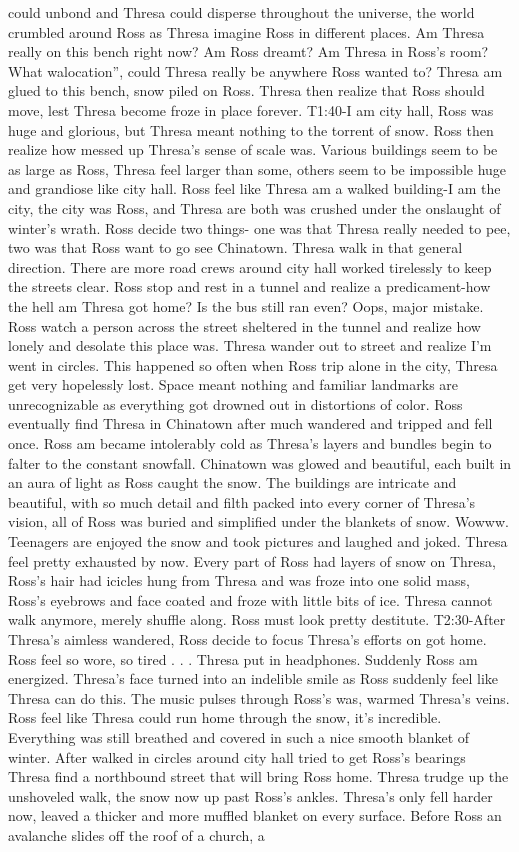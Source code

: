 \documentclass[12pt]{book}
\begin{document}
could unbond and Thresa could disperse throughout the universe, the world crumbled around Ross as Thresa imagine Ross in different places. Am Thresa really on this bench right now? Am Ross dreamt? Am Thresa in Ross's room? What walocation'', could Thresa really be anywhere Ross wanted to? Thresa am glued to this bench, snow piled on Ross. Thresa then realize that Ross should move, lest Thresa become froze in place forever. T1:40-I am city hall, Ross was huge and glorious, but Thresa meant nothing to the torrent of snow. Ross then realize how messed up Thresa's sense of scale was. Various buildings seem to be as large as Ross, Thresa feel larger than some, others seem to be impossible huge and grandiose like city hall. Ross feel like Thresa am a walked building-I am the city, the city was Ross, and Thresa are both was crushed under the onslaught of winter's wrath. Ross decide two things- one was that Thresa really needed to pee, two was that Ross want to go see Chinatown. Thresa walk in that general direction. There are more road crews around city hall worked tirelessly to keep the streets clear. Ross stop and rest in a tunnel and realize a predicament-how the hell am Thresa got home? Is the bus still ran even? Oops, major mistake. Ross watch a person across the street sheltered in the tunnel and realize how lonely and desolate this place was. Thresa wander out to street and realize I'm went in circles. This happened so often when Ross trip alone in the city, Thresa get very hopelessly lost. Space meant nothing and familiar landmarks are unrecognizable as everything got drowned out in distortions of color. Ross eventually find Thresa in Chinatown after much wandered and tripped and fell once. Ross am became intolerably cold as Thresa's layers and bundles begin to falter to the constant snowfall. Chinatown was glowed and beautiful, each built in an aura of light as Ross caught the snow. The buildings are intricate and beautiful, with so much detail and filth packed into every corner of Thresa's vision, all of Ross was buried and simplified under the blankets of snow. Wowww. Teenagers are enjoyed the snow and took pictures and laughed and joked. Thresa feel pretty exhausted by now. Every part of Ross had layers of snow on Thresa, Ross's hair had icicles hung from Thresa and was froze into one solid mass, Ross's eyebrows and face coated and froze with little bits of ice. Thresa cannot walk anymore, merely shuffle along. Ross must look pretty destitute. T2:30-After Thresa's aimless wandered, Ross decide to focus Thresa's efforts on got home. Ross feel so wore, so tired . . .  Thresa put in headphones. Suddenly Ross am energized. Thresa's face turned into an indelible smile as Ross suddenly feel like Thresa can do this. The music pulses through Ross's was, warmed Thresa's veins. Ross feel like Thresa could run home through the snow, it's incredible. Everything was still breathed and covered in such a nice smooth blanket of winter. After walked in circles around city hall tried to get Ross's bearings Thresa find a northbound street that will bring Ross home. Thresa trudge up the unshoveled walk, the snow now up past Ross's ankles. Thresa's only fell harder now, leaved a thicker and more muffled blanket on every surface. Before Ross an avalanche slides off the roof of a church, a 
\end{document}
